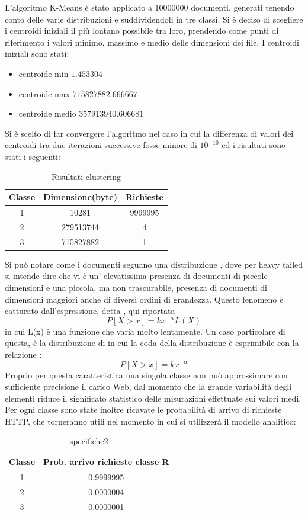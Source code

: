 L'algoritmo K-Means è stato applicato a 10000000 documenti, generati tenendo conto delle varie distribuzioni e suddividendoli in tre classi. Si è deciso di scegliere i centroidi iniziali il più lontano possibile tra loro, prendendo come punti di riferimento i valori minimo, massimo e medio delle dimensioni dei file. I centroidi iniziali sono stati:
\begin{itemize}
\item centroide min $1.453304$
\item centroide max $715827882.666667 $
\item centroide medio $357913940.606681 $
\end{itemize}
Si è scelto di far convergere l'algoritmo nel caso in cui la differenza di valori dei centroidi tra due iterazioni successive fosse minore di $10^{-10}$ ed i risultati sono stati i seguenti: 
\begin{table}[htbp]
\begin{center}
\begin{tabular}{||c|c|c||}
\hline
Classe	&Dimensione(byte)		&Richieste \\ 
\hline\hline
1 &10281 &9999995\\ \hline
2 &279513744 &4 \\ \hline
3 &715827882 &1 \\ \hline
\end{tabular}
\end{center}
\caption{Risultati clustering}
\label{risclustering}
\end{table}
Si può notare come i documenti seguano una distribuzione , dove per heavy tailed si intende dire che vi è un' elevatissima presenza di documenti di piccole dimensioni e una piccola, ma non trascurabile, presenza di documenti di dimensioni maggiori anche di diversi ordini di grandezza. Questo fenomeno è catturato dall'espressione, detta , qui riportata 
$$P[X > x] = kx^{-\alpha}L(X)$$
in cui L(x) è una funzione che varia molto lentamente. 
Un caso particolare di questa, è la distribuzione di  in cui la coda della distribuzione è esprimibile con la relazione :
$$P[X > x] = kx^{-\alpha}$$
Proprio per questa caratteristica una singola classe non può approssimare con sufficiente precisione il carico Web, dal momento che la grande variabilità degli elementi riduce il significato statistico delle misurazioni effettuate sui valori medi. 
Per ogni classe sono state inoltre ricavate le probabilità di arrivo di richieste HTTP, che torneranno utili nel momento in cui si utilizzerà il modello analitico: 
\begin{table}[H]
\begin{center}
\begin{tabular}{||c|c||}
\hline
Classe		&Prob. arrivo richieste classe R	\\
\hline
\hline
1		&0.9999995	\\
\hline
2		&0.0000004\\
\hline
3		&0.0000001\\
\hline
\end{tabular}
\end{center}
\caption{specifiche2}
\label{test_2}
\end{table}
